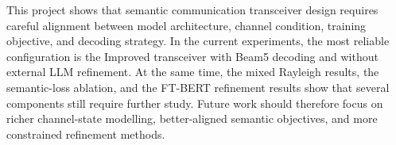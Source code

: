 This project shows that semantic communication transceiver design requires careful alignment between model architecture, channel condition, training objective, and decoding strategy. In the current experiments, the most reliable configuration is the Improved transceiver with Beam5 decoding and without external LLM refinement. At the same time, the mixed Rayleigh results, the semantic-loss ablation, and the FT-BERT refinement results show that several components still require further study. Future work should therefore focus on richer channel-state modelling, better-aligned semantic objectives, and more constrained refinement methods.
